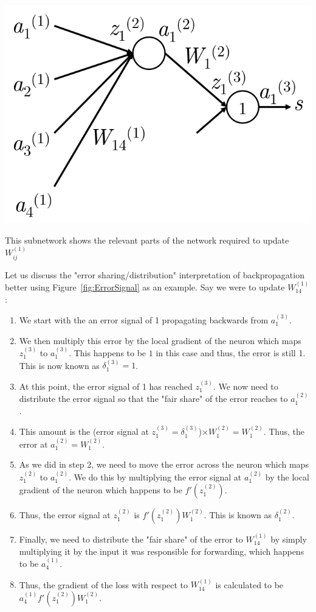 \documentclass{tufte-handout}
\begin{document}
\begin{marginfigure}%
  \includegraphics[width=\linewidth]{ErrorSignal}
  \caption{This subnetwork shows the relevant parts of the network required to update $W^{(1)}_{ij}$}
  \label{fig:ErrorSignal}
\end{marginfigure}

Let us discuss the "error sharing/distribution" interpretation of backpropagation better using Figure~\ref{fig:ErrorSignal} as an example. Say we were to update $W^{(1)}_{14}$:

\begin{enumerate}
\item We start with the an error signal of 1 propagating backwards from $a_1^{(3)}$.
\item We then multiply this error by the local gradient of the neuron which maps $z_1^{(3)}$ to $a_1^{(3)}$. This happens to be $1$ in this case and thus, the error is still 1. This is now known as $\delta_1^{(3)} = 1$.
\item At this point, the error signal of 1 has reached $z_1^{(3)}$. We now need to distribute the error signal so that the "fair share" of the error reaches to $a_1^{(2)}$.
\item This amount is the (error signal at $z_1^{(3)} = \delta_1^{(3)}$)$ \times W_{1}^{(2)} = W_{1}^{(2)}$. Thus, the error at $a_1^{(2)} = W_{1}^{(2)}$.
\item As we did in step 2, we need to move the error across the neuron which maps $z_1^{(2)}$ to $a_1^{(2)}$. We do this by multiplying the error signal at $a_1^{(2)}$ by the local gradient of the neuron which happens to be $f'(z_1^{(2)})$.
\item Thus, the error signal at $z_1^{(2)}$ is $f'(z_1^{(2)})  W_{1}^{(2)}$. This is known as $\delta_1^{(2)}$.
\item Finally, we need to distribute the "fair share" of the error to $W^{(1)}_{14}$ by simply multiplying it by the input it was responsible for forwarding, which happens to be $a_4^{(1)}$.
\item Thus, the gradient of the loss with respect to $W^{(1)}_{14}$ is calculated to be $a_4^{(1)} f'(z_1^{(2)})  W_{1}^{(2)}$.
\end{enumerate}
\end{document}
